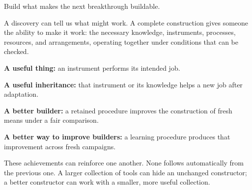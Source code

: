 \begin{thesisbox}
{\Large\bfseries\raggedright Build what makes the next breakthrough buildable.}
\end{thesisbox}
A discovery can tell us what might work. A complete construction gives someone the ability to make it work: the necessary knowledge, instruments, processes, resources, and arrangements, operating together under conditions that can be checked.

\begin{center}
\end{center}

\textbf{A useful thing:} an instrument performs its intended job.\par
\textbf{A useful inheritance:} that instrument or its knowledge helps a new job after adaptation.\par
\textbf{A better builder:} a retained procedure improves the construction of fresh means under a fair comparison.\par
\textbf{A better way to improve builders:} a learning procedure produces that improvement across fresh campaigns.

These achievements can reinforce one another. None follows automatically from the previous one. A larger collection of tools can hide an unchanged constructor; a better constructor can work with a smaller, more useful collection.

